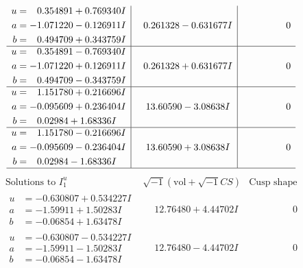 \documentclass[1p]{elsarticle_modified}
\theoremstyle{definition}
\newcommand{\I}{\sqrt{-1}}
\begin{document}
$$\begin{array}{c|c|c}
\begin{aligned}
u &= \phantom{-}0.354891 + 0.769340 I \\
a &= -1.071220 - 0.126911 I \\
b &= \phantom{-}0.494709 + 0.343759 I\end{aligned}
 & \phantom{-}0.261328 - 0.631677 I & \phantom{-0.000000 } 0 \\ \hline\begin{aligned}
u &= \phantom{-}0.354891 - 0.769340 I \\
a &= -1.071220 + 0.126911 I \\
b &= \phantom{-}0.494709 - 0.343759 I\end{aligned}
 & \phantom{-}0.261328 + 0.631677 I & \phantom{-0.000000 } 0 \\ \hline\begin{aligned}
u &= \phantom{-}1.151780 + 0.216696 I \\
a &= -0.095609 + 0.236404 I \\
b &= \phantom{-}0.02984 + 1.68336 I\end{aligned}
 & \phantom{-}13.60590 - 3.08638 I & \phantom{-0.000000 } 0 \\ \hline\begin{aligned}
u &= \phantom{-}1.151780 - 0.216696 I \\
a &= -0.095609 - 0.236404 I \\
b &= \phantom{-}0.02984 - 1.68336 I\end{aligned}
 & \phantom{-}13.60590 + 3.08638 I & \phantom{-0.000000 } 0\\
 \hline 
 \end{array}$$\newpage$$\begin{array}{c|c|c}  
\text{Solutions to }I^u_{1}& \I (\text{vol} + \sqrt{-1}CS) & \text{Cusp shape}\\
 \hline 
\begin{aligned}
u &= -0.630807 + 0.534227 I \\
a &= -1.59911 + 1.50283 I \\
b &= -0.06854 + 1.63478 I\end{aligned}
 & \phantom{-}12.76480 + 4.44702 I & \phantom{-0.000000 } 0 \\ \hline\begin{aligned}
u &= -0.630807 - 0.534227 I \\
a &= -1.59911 - 1.50283 I \\
b &= -0.06854 - 1.63478 I\end{aligned}
 & \phantom{-}12.76480 - 4.44702 I & \phantom{-0.000000 } 0 \\ \hline\begin{aligned}

\end{aligned}
\end{array}$$
\end{document}
